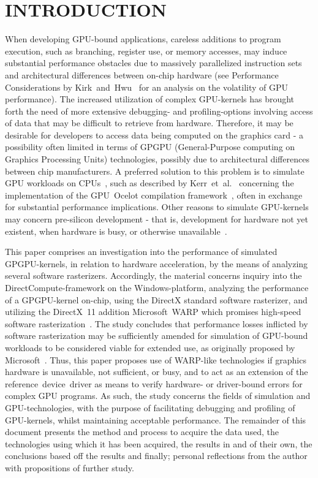 
\section{INTRODUCTION}
\label{sec:introduction}
When developing GPU-bound applications, careless additions to  program execution, such as branching, register use, or memory accesses, may induce substantial performance obstacles due to massively parallelized instruction sets and architectural differences between on-chip hardware (see Performance Considerations by Kirk~and~Hwu~\cite[ch.~6]{Kirk:2010:PMP:1841511} for an analysis on the volatility of GPU performance).
The increased utilization of complex GPU-kernels has brought forth the need of more extensive debugging- and profiling-options involving access of data that may be difficult to retrieve from hardware.
Therefore, it may be desirable for developers to access data being computed on the graphics card - a possibility often limited in terms of GPGPU (General-Purpose computing on Graphics Processing Units) technologies, possibly due to architectural differences between chip manufacturers.
A preferred solution to this problem is to simulate GPU workloads on CPUs~, such as described by Kerr~et~al.~\cite[p.~416-419]{Hwu:2011:GCG:2103614} concerning the implementation of the GPU~Ocelot compilation framework~, often in exchange for substantial performance implications.
Other reasons to simulate GPU-kernels may concern pre-silicon development - that is, development for hardware not yet existent, when hardware is busy, or otherwise unavailable~.

This paper comprises an investigation into the performance of simulated GPGPU-kernels, in relation to hardware acceleration, by the means of analyzing several software rasterizers.
Accordingly, the material concerns inquiry into the DirectCompute-framework on the Windows-platform, analyzing the performance of a GPGPU-kernel on-chip, using the DirectX standard software rasterizer, and utilizing the DirectX~11 addition Microsoft~WARP which promises high-speed software rasterization~.
The study concludes that performance losses inflicted by software rasterization may be sufficiently amended for simulation of GPU-bound workloads to be considered viable for extended use, as originally proposed by Microsoft~.
Thus, this paper proposes use of WARP-like technologies if graphics hardware is unavailable, not sufficient, or busy, and to act as an extension of the reference~device~driver as means to verify hardware- or driver-bound errors for complex GPU programs.
As such, the study concerns the fields of simulation and GPU-technologies, with the purpose of facilitating debugging and profiling of GPU-kernels, whilst maintaining acceptable performance.
The remainder of this document presents the method and process to acquire the data used, the technologies using which it has been acquired, the results in and of their own, the conclusions based off the results and finally; personal reflections from the author with propositions of further study.
